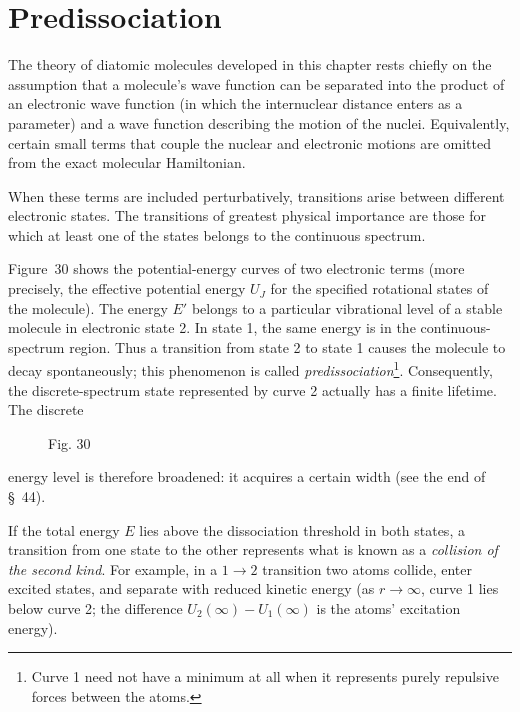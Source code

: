 \section{Predissociation}

The theory of diatomic molecules developed in this chapter rests chiefly on the assumption that a molecule's wave function can be separated into the product of an electronic wave function (in which the internuclear distance enters as a parameter) and a wave function describing the motion of the nuclei. Equivalently, certain small terms that couple the nuclear and electronic motions are omitted from the exact molecular Hamiltonian.

When these terms are included perturbatively, transitions arise between different electronic states. The transitions of greatest physical importance are those for which at least one of the states belongs to the continuous spectrum.

Figure~30 shows the potential-energy curves of two electronic terms (more precisely, the effective potential energy $U_J$ for the specified rotational states of the molecule). The energy $E'$ belongs to a particular vibrational level of a stable molecule in electronic state 2. In state 1, the same energy is in the continuous-spectrum region. Thus a transition from state 2 to state 1 causes the molecule to decay spontaneously; this phenomenon is called \emph{predissociation}\footnote{Curve 1 need not have a minimum at all when it represents purely repulsive forces between the atoms.}. Consequently, the discrete-spectrum state represented by curve 2 actually has a finite lifetime. The discrete

\begin{figure}[ht]
\centering
{}
\caption*{Fig. 30}
\end{figure}

energy level is therefore broadened: it acquires a certain width (see the end of \S~44).

If the total energy $E$ lies above the dissociation threshold in both states, a transition from one state to the other represents what is known as a \emph{collision of the second kind}. For example, in a $1\to2$ transition two atoms collide, enter excited states, and separate with reduced kinetic energy (as $r\to\infty$, curve 1 lies below curve 2; the difference $U_2(\infty)-U_1(\infty)$ is the atoms' excitation energy).

